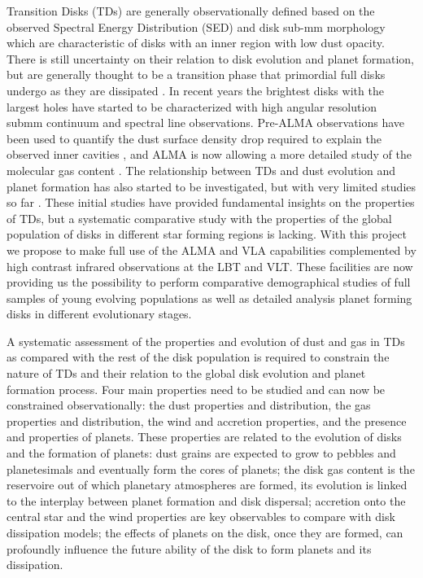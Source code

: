 \documentclass[10pt,fleqn,twoside]{article}
\begin{document}
Transition Disks (TDs) are generally observationally defined based on the observed Spectral Energy
Distribution (SED) and disk sub-mm morphology which are characteristic of disks with an inner region
with low dust opacity. There is still uncertainty on their relation 
to disk evolution and planet formation, but are generally thought to be a transition phase that
primordial full disks undergo as they are dissipated \citep[see e.g.\ ][]{2011ARA&A..49...67W}. In recent 
years the brightest disks with the largest holes have started to be characterized with high angular resolution submm continuum and spectral line observations. 
Pre-ALMA observations have been used to quantify the dust surface density drop required to 
explain the observed inner cavities \citep[e.g.\ ][]{2011ApJ...732...42A}, and ALMA is now allowing a more 
detailed study of the molecular gas content \citep[e.g.\ ][]{2015A&A...579A.106V}. 
The relationship between TDs and dust evolution and planet formation has also started to be investigated,
but with very limited studies so far \citep[e.g.\ ][]{2014A&A...564A..51P,2015Natur.527..342S}.
These initial studies have provided fundamental insights on the properties of TDs, but a 
systematic comparative study with the properties of the global population of disks in different 
star forming regions is lacking. With this project we propose to make full use of the ALMA and VLA capabilities complemented by high contrast infrared observations at the LBT and VLT. These facilities 
are now providing us the possibility to perform comparative demographical studies of full samples of young evolving populations as well as detailed analysis planet forming disks in different evolutionary stages. 

A systematic assessment of the properties and evolution of dust and gas in TDs as compared with the rest of the disk population is required to constrain the nature of TDs and their relation to the global disk evolution and planet formation process. Four main properties need to be studied and can now be constrained 
observationally: the dust properties and distribution, the gas properties and distribution, the wind and accretion properties, and the presence and properties of planets. These properties are related to the evolution of disks and the formation of planets: dust grains are expected to grow to pebbles and planetesimals and eventually form the cores of planets; the disk gas content is the reservoire out of which planetary atmospheres are formed, its evolution is linked to the interplay between planet formation and disk dispersal; accretion onto the central star and the wind properties are key observables to compare with disk dissipation models; the effects of planets on the disk, once they are formed, can profoundly influence the future ability of the disk to form planets and its dissipation.
\end{document}

